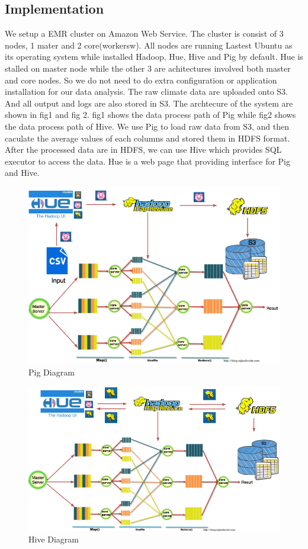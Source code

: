 \subsection{Implementation}
We setup a EMR cluster on Amazon Web Service.
The cluster is consist of 3 nodes, 1 mater and 2 core(workersw). All nodes are running Lastest Ubuntu as its operating system while installed Hadoop, Hue, Hive and Pig by default.
Hue is stalled on master node while the other 3 are achitectures involved both master and core nodes.
So we do not need to do extra configuration or application installation for our data analysis.
The raw climate data are uploaded onto S3. And all output and logs are also stored in S3.
The archtecure of the system are shown in fig1 and fig 2. fig1 shows the data process path of Pig while fig2 shows the data process path of Hive.
We use Pig to load raw data from S3, and then caculate the average values of each columns and stored them in HDFS format.
After the processed data are in HDFS, we can use Hive which provides SQL executor to access the data.
Hue is a web page that providing interface for Pig and Hive. 

\begin{figure}[h!]
	\begin{center}
		\includegraphics[width=1\columnwidth]{../images/PigDiagram}
		\caption{Pig Diagram}
		\label{fig:dataDiagr}
	\end{center}
	\vspace{-10pt}
\end{figure}


\begin{figure}[h!]
	\begin{center}
		\includegraphics[width=1\columnwidth]{../images/HiveDiagram-2}
		\caption{Hive Diagram}
		\label{fig:dataDiagr}
	\end{center}
	\vspace{-10pt}
\end{figure}


